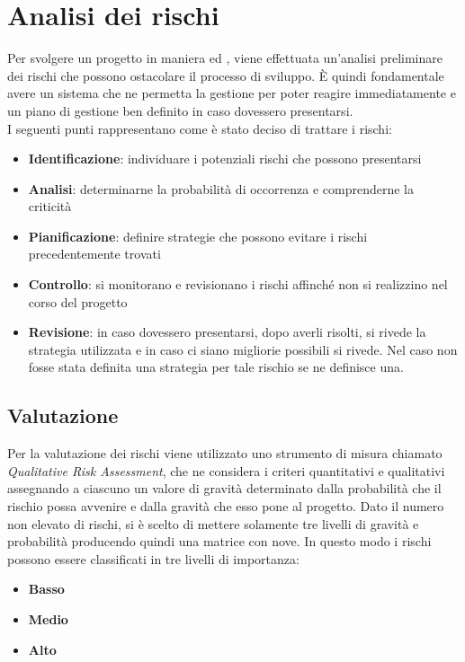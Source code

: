 
\newpage
\section{Analisi dei rischi} \label{AnalisiDeiRischi}
	Per svolgere un progetto in maniera  ed , viene effettuata un'analisi preliminare dei rischi che possono ostacolare il processo di sviluppo.
	È quindi fondamentale avere un sistema che ne permetta la gestione per poter reagire immediatamente e un piano di gestione ben definito in caso dovessero presentarsi.\\
	I seguenti punti rappresentano come è stato deciso di trattare i rischi:
	\begin{itemize}
		\item \textbf{Identificazione}: individuare i potenziali rischi che possono presentarsi
		\item \textbf{Analisi}: determinarne la probabilità di occorrenza e comprenderne la criticità
		\item \textbf{Pianificazione}: definire strategie che possono evitare i rischi precedentemente trovati
		\item \textbf{Controllo}: si monitorano e revisionano i rischi affinché non si realizzino nel corso del progetto
		\item \textbf{Revisione}: in caso dovessero presentarsi, dopo averli risolti, si rivede la strategia utilizzata e in caso ci siano migliorie possibili si rivede. Nel caso non fosse stata definita una strategia per tale rischio se ne definisce una.
	\end{itemize}
	\subsection{Valutazione}
	Per la valutazione dei rischi viene utilizzato uno strumento di misura chiamato \textit{Qualitative Risk Assessment}, che ne considera i criteri quantitativi e qualitativi assegnando a ciascuno un valore di gravità determinato dalla probabilità che il rischio possa avvenire e dalla gravità che esso pone al progetto.
	Dato il numero non elevato di rischi, si è scelto di mettere solamente tre livelli di gravità e probabilità producendo quindi una matrice con nove. In questo modo i rischi possono essere classificati in tre livelli di importanza:
	
	\begin{itemize}
		\item \textbf{Basso}
		\item \textbf{Medio}
		\item \textbf{Alto}
	\end{itemize}

